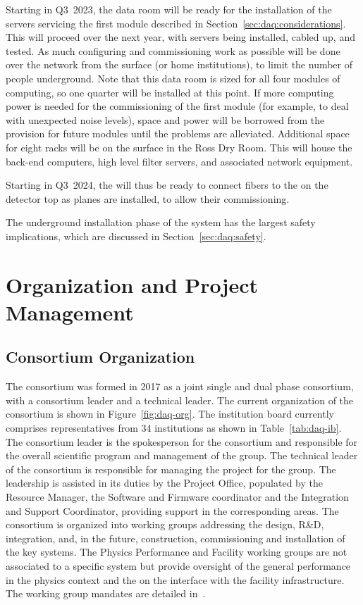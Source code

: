 Starting in Q3~2023, the data room will be ready for the installation of
the  servers servicing the first module described in
Section~\ref{sec:daq:considerations}.  This will proceed over the
next year, with servers being installed, cabled up, and tested.
As much configuring and commissioning work as possible will be done over
the network from the surface (or home institutions), to limit the number
of people underground.  Note that this data room is sized for all four
modules of  computing, so one quarter will be installed at this
point.  If more computing power is needed for the commissioning of the
first module (for example, to deal with unexpected noise levels), space
and power will be borrowed from the provision for future modules until the problems are
alleviated. 
Additional space for eight racks will be on the surface in the Ross Dry
Room. This will house the back-end computers, high level filter servers, and associated network equipment.

Starting in Q3~2024, the  will thus be ready to connect fibers to the
 on the detector top as planes are installed, to allow their commissioning.

The underground installation phase of the  system has the largest safety
implications, which are discussed in Section~\ref{sec:daq:safety}.

\section{Organization and Project Management}
\label{sec:daq:organization}


\subsection{Consortium Organization}

The  consortium was formed in 2017 as a joint single and
dual phase consortium, with a consortium leader and a technical
leader. The current organization of the consortium is shown in
Figure~\ref{fig:daq-org}. The  institution board currently comprises
representatives from 34 institutions as shown in Table~\ref{tab:daq-ib}. The consortium leader is the spokesperson for the consortium and responsible for the overall scientific program and management of the group. The technical leader of the consortium is responsible for
managing the project for the group. The leadership is assisted in its duties by the Project Office, populated by the Resource Manager, the Software and Firmware coordinator and the Integration and Support Coordinator, providing support in the corresponding areas. 
The consortium is organized into working groups addressing the design,
R\&D, integration, and, in the future, construction, commissioning and installation of the key  systems. The Physics Performance and Facility working groups are not associated to a specific system but provide oversight of the general  performance in the physics context and the on the interface with the facility infrastructure. The  working group mandates are detailed in~.

